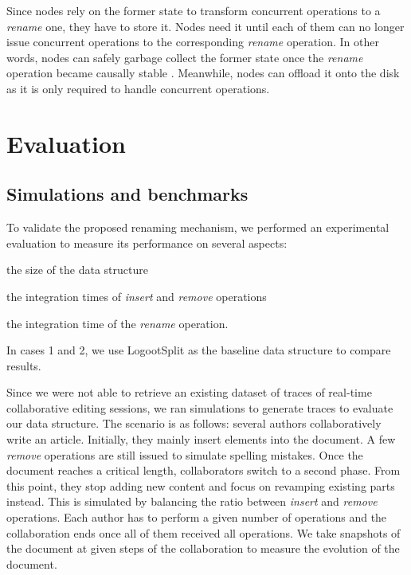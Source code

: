 \documentclass[sigplan,10pt,authorversion]{acmart}
\begin{document}
Since nodes rely on the former state to transform concurrent operations to a \emph{rename} one, they have to store it.
Nodes need it until each of them can no longer issue concurrent operations to the corresponding \emph{rename} operation.
In other words, nodes can safely garbage collect the former state once the \emph{rename} operation became causally stable \cite{10.1007/978-3-662-43352-2_11}.
Meanwhile, nodes can offload it onto the disk as it is only required to handle concurrent operations.


\section{Evaluation}
\label{sec:evaluation}

\subsection{Simulations and benchmarks}

To validate the proposed renaming mechanism, we performed an experimental evaluation to measure its performance on several aspects:
\begin{enumerate*}
    \item the size of the data structure
    \item the integration times of \emph{insert} and \emph{remove} operations
    \item the integration time of the \emph{rename} operation.
\end{enumerate*}
In cases 1 and 2, we use LogootSplit as the baseline data structure to compare results.

Since we were not able to retrieve an existing dataset of traces of real-time collaborative editing sessions, we ran simulations to generate traces to evaluate our data structure.
The scenario is as follows: several authors collaboratively write an article.
Initially, they mainly insert elements into the document.
A few \emph{remove} operations are still issued to simulate spelling mistakes.
Once the document reaches a critical length, collaborators switch to a second phase.
From this point, they stop adding new content and focus on revamping existing parts instead.
This is simulated by balancing the ratio between \emph{insert} and \emph{remove} operations.
Each author has to perform a given number of operations and the collaboration ends once all of them received all operations.
We take snapshots of the document at given steps of the collaboration to measure the evolution of the document.
\end{document}
